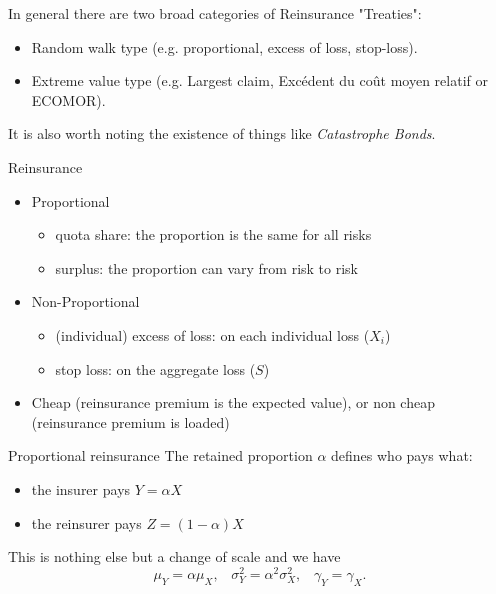 \documentclass[11pt]{beamer}
\begin{document}
\begin{frame}{}

In general there are two broad categories of Reinsurance "Treaties":
\vfill
\begin{itemize}

\item Random walk type (e.g. proportional, excess of loss, stop-loss). 

\vfill

\item Extreme value type (e.g. Largest claim, Excédent du coût moyen relatif or ECOMOR).

\end{itemize}
\vfill
It is also worth noting the existence of things like \textit{Catastrophe Bonds}. 

\end{frame}
\begin{frame}{Reinsurance}

  \begin{itemize}
  \item Proportional
    \begin{itemize}
    \item quota share: the proportion is the same for all risks
    \item surplus: the proportion can vary from risk to risk
    \end{itemize}
    \vfill
  \item Non-Proportional
    \begin{itemize}
    \item (individual) excess of loss: on each individual loss ($X_i$)
    \item stop loss: on the aggregate loss ($S$)
    \end{itemize}
    \vfill
  \item Cheap (reinsurance premium is the expected value), or \linebreak non cheap (reinsurance premium is loaded)
  \end{itemize}
\end{frame}
\begin{frame}{Proportional reinsurance}
  The \alert{retained proportion $\alpha$} defines who pays what:
  \begin{itemize}
  \item the insurer pays $Y=\alpha X$
  \item the reinsurer pays $Z=(1-\alpha) X$
  \end{itemize}
  This is nothing else but a change of scale and we have
  $$\mu_Y=\alpha \mu_X,\;\;\;\sigma^2_Y=\alpha^2\sigma^2_X,\;\;\;\gamma_Y=\gamma_X.$$
  
\end{frame}
\end{document}
